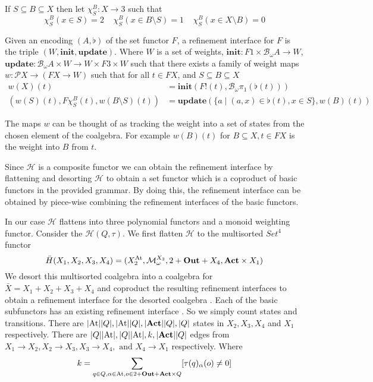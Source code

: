 \documentclass[a4paper,UKenglish,cleveref, autoref, thm-restate]{lipics-v2021}
\newcommand{\Out}{\textbf{\upshape{Out}}}
\newcommand{\Act}{\textbf{\upshape{Act}}}
\newcommand{\At}{\text{\upshape{At}}}
\newcommand{\HCo}{$\mathcal{H}$\text{-coalgebra }}
\newcommand{\Mon}{\mathcal{M}_\omega}
\theoremstyle{plain}\newtheoremrep{thm}{Theorem}[section]
\begin{document}
\begin{toappendix}
		\begin{defn}[\cite{10.1007/978-3-030-30942-8_18}]
			If $S\subseteq B \subseteq X$ then let $\chi^B_S:X \to 3$ such that
	$$			\chi^B_S(x \in S) = 2 \;\;\;\;
				\chi^B_S(x \in B\setminus S) = 1 \;\;\;\;
				\chi^B_S(x \in X \setminus B) = 0$$
		\end{defn}
		\begin{defn}
			Given an encoding $(A, \flat)$ of the set functor $F$, a refinement interface for $F$ is the triple $(W, \textbf{init}, \textbf{update})$. Where $W$ is a set of weights, $\textbf{init}:F1 \times \mathcal{B}_\omega A \to W$, $\textbf{update}:\mathcal{B}_\omega A \times W \to W \times F3 \times W$ such that there exists a family of weight maps $w: \mathcal{P}X \to (FX \to W)$ such that for all $t \in FX$, and $S\subseteq B \subseteq X$
			\begin{align*}
				w(X)(t) &= \textbf{init}(F!(t), \mathcal{B}_\omega\pi_1(\flat(t)))\\
				(w(S)(t), F\chi_S^B(t), w(B\setminus S)(t)) &= \textbf{update}(\{a \mid (a, x) \in \flat(t), x \in S\}, w(B)(t))
			\end{align*}
		\end{defn}
		The maps $w$ can be thought of as tracking the weight into a set of states from the chosen element of the coalgebra. For example $w(B)(t)$ for $B \subseteq X, t \in FX$ is the weight into $B$ from $t$. 
		
		Since $\mathcal H$ is a composite functor we can obtain the refinement interface by flattening and desorting $\mathcal H$ \cite[Section 8]{wissmann2020efficient} to obtain a set functor which is a coproduct of basic functors in the provided grammar. By doing this, the refinement interface can be obtained by piece-wise combining the refinement interfaces of the basic functors. 
		
		In our case $\mathcal H$ flattens into three polynomial functors and a monoid weighting functor. Consider the \HCo $(Q,\tau)$. We first flatten $\mathcal H$ to the multisorted $Set^4$ functor
		$$\bar H(X_1, X_2, X_3, X_4) = (X_2^\At, \Mon^{X_3}, 2+\Out+X_4, \Act\times X_1)$$ We desort this multisorted coalgebra into a coalgebra for $\bar X =X_1 + X_2 + X_3 +X_4$ and coproduct the resulting refinement interfaces to obtain a refinement interface for the desorted coalgebra \cite[Section 8]{wissmann2020efficient}. Each of the basic subfunctors has an existing refinement interface \cite{wissmann2020efficient, 10.1007/978-3-030-30942-8_18}. So we simply count states and transitions. There are $|\At||Q|, |\At||Q|, |\Act||Q|, |Q|$ states in $X_2, X_3, X_4$ and $X_1$ respectively. There are $|Q||\At|, |Q||\At|, k, |\Act||Q|$ edges from $X_1 \to X_2, X_2 \to X_3, X_3 \to X_4, \text{ and } X_4 \to X_1$  respectively. Where $$k = \sum_{q \in Q, \alpha \in \At, o \in 2+\Out+\Act \times Q} [\tau(q)_\alpha(o) \neq 0]$$
		

\end{toappendix}
\end{document}
